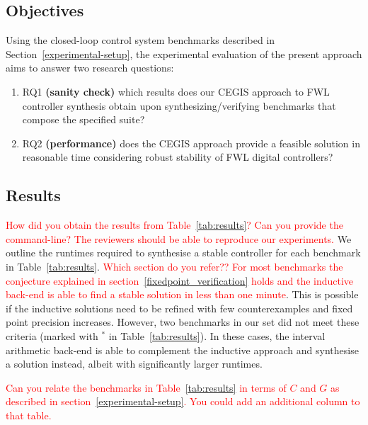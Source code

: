 \documentclass{sig-alternate-05-2015}
\begin{document}
\subsection{Objectives}
\label{experimental-objectives}

Using the closed-loop control system benchmarks described in Section~\ref{experimental-setup}, 
the experimental evaluation of the present approach aims to answer two research questions:
%
\begin{enumerate}
	\item RQ1 \textbf{(sanity check)} which results does our CEGIS approach to FWL controller synthesis 
	obtain upon synthesizing/verifying benchmarks that compose the specified suite?
  \item RQ2 \textbf{(performance)} does the CEGIS approach provide a feasible solution in reasonable time
	considering robust stability of FWL digital controllers?	
\end{enumerate}

\subsection{Results}
\label{experimental-results}

\textcolor{red}{How did you obtain the results from Table~\ref{tab:results}? 
Can you provide the command-line? The reviewers should be able to reproduce our experiments.}
We outline the runtimes required to synthesise a stable controller for each
benchmark in Table~\ref{tab:results}. \textcolor{red}{Which section do you refer??
For most benchmarks the conjecture explained in section~\ref{fixedpoint_verification} 
holds and the inductive back-end is able to find a stable solution in less than one minute}. 
This is possible if the inductive solutions need to be refined with few counterexamples 
and fixed point precision increases. However, two benchmarks in our set did not meet these
criteria (marked with $^*$ in Table~\ref{tab:results}). In these cases, 
the interval arithmetic back-end is able to complement the inductive approach
and synthesise a solution instead, albeit with significantly larger runtimes.

\textcolor{red}{Can you relate the benchmarks in Table~\ref{tab:results} in terms of 
$C$ and $G$ as described in section~\ref{experimental-setup}. You could add an additional column to that table.}
\end{document}
